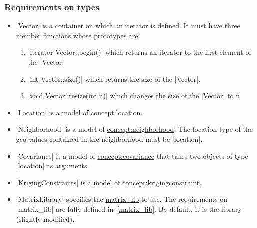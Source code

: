 \documentclass[12pt,twoside]{report}
\begin{document}
\htmlrule[CLEAR=all]  \subsubsection*{Requirements on types}
\begin{itemize}
\item |Vector| is a container on which an iterator is defined. It must have three member functions whose prototypes are:
  \begin{enumerate}
  \item |iterator Vector::begin()| which returns an iterator to the first element of the |Vector|
  \item |int Vector::size()| which returns the size of the |Vector|.
  \item |void Vector::resize(int n)| which changes the size of the |Vector| to n
  \end{enumerate}
\item |Location| is a model of \hyperref{Location}{Location (see Section}{)}{concept:location}.
\item |Neighborhood| is a model of \hyperref{Neighborhood}{Neighborhood (see Section}{)}{concept:neighborhood}. The location type of the geo-values contained in the neighborhood must be |location|.
\item |Covariance| is a model of \hyperref{Covariance}{Covariance}{}{concept:covariance} that takes two objects of type |location| as arguments.
\item |KrigingConstraints| is a model of \hyperref{Kriging Constraints}{Kriging Constraints}{}{concept:krigingconstraint}.
\item |MatrixLibrary| specifies the \hyperref{linear algebra library}{linear algebra library}{}{matrix_lib} to use. The requirements on |matrix_lib| are fully defined in~\ref{matrix_lib}. By default, it is the library (slightly modified).
\end{itemize}

\end{document}
